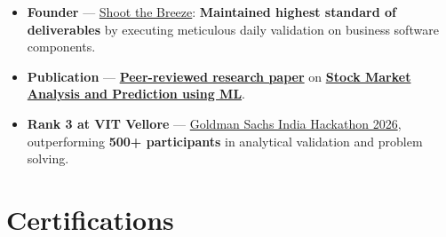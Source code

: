 \documentclass[a4paper,11pt]{article}
\newcommand{\ulink}[2]{\href{#1}{#2}}
\begin{document}
\begin{itemize}[nosep, leftmargin=1.5em, itemsep=2pt, topsep=2pt]
  \item {\color[HTML]{0A0A0A}\fontsize{11}{14}\selectfont \textbf{Founder} --- \ulink{https://shoot-the-breeze.vercel.app}{Shoot the Breeze}: \textbf{Maintained highest standard of deliverables} by executing meticulous daily validation on business software components.}
  \item {\color[HTML]{0A0A0A}\fontsize{11}{14}\selectfont \textbf{Publication} --- \ulink{https://www.elruha.org/_files/ugd/614b1f_6b95e1b697bf452b9907ba46e0151c05.pdf\#page=774}{\textbf{Peer-reviewed research paper}} on \ulink{https://github.com/su-jin1425/Set-Project}{\textbf{Stock Market Analysis and Prediction using ML}}.}
  \item {\color[HTML]{0A0A0A}\fontsize{11}{14}\selectfont \textbf{Rank 3 at VIT Vellore} --- \ulink{https://www.hackerrank.com/contests/goldman-sachs-india-hackathon-2026-cs/leaderboard}{Goldman Sachs India Hackathon 2026}, outperforming \textbf{500+ participants} in analytical validation and problem solving.}
\end{itemize}

\section{Certifications}
\vspace{2pt}
\end{document}
